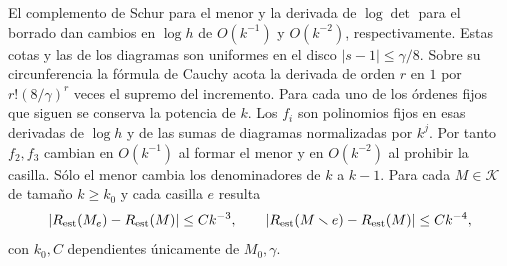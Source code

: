 El complemento de Schur para el menor y la derivada de $\log\det$ para el borrado dan cambios
en $\log h$ de $O(k^{-1})$ y $O(k^{-2})$, respectivamente. Estas cotas y las de los diagramas
son uniformes en el disco $|s-1|\le\gamma/8$. Sobre su circunferencia la fórmula de
Cauchy acota la derivada de orden $r$ en $1$ por $r!(8/\gamma)^r$ veces el supremo
del incremento. Para cada uno de los órdenes fijos que siguen se conserva la potencia de $k$.
Los $f_i$ son polinomios fijos en esas derivadas de $\log h$ y de las sumas de diagramas
normalizadas por $k^j$. Por tanto $f_2,f_3$ cambian en $O(k^{-1})$ al formar el menor y en
$O(k^{-2})$ al prohibir la casilla. Sólo el menor cambia los denominadores de $k$ a $k-1$.
Para cada $M\in\mathcal K$ de tamaño $k\ge k_0$ y cada casilla $e$ resulta
\[
 |R_{\rm est}(M_e)-R_{\rm est}(M)|\le C k^{-3},\qquad
 |R_{\rm est}(M\setminus e)-R_{\rm est}(M)|\le C k^{-4},
\]
con $k_0,C$ dependientes únicamente de $M_0,\gamma$.
